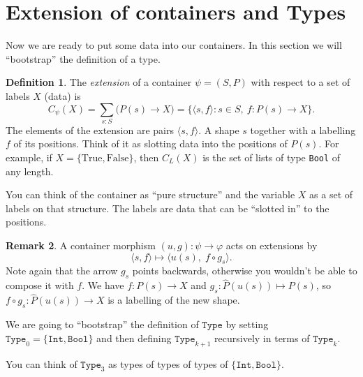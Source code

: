 \documentclass[11pt, a4paper]{article}
\theoremstyle{definition}
\newtheorem{definition}{Definition}[section]
\newtheorem{remark}[definition]{Remark}
\theoremstyle{plain}
\begin{document}
\newpage

\section{Extension of containers and Types}

Now we are ready to put some data into our containers.  In this
section we will ``bootstrap'' the definition of a type.

\noindent\colorbox{gray!15}{\parbox{\dimexpr\linewidth-2\fboxsep}{%
\begin{definition}\label{def:extension}
The \emph{extension} of a container $\psi = (S, P)$ with respect to a set
of labels $X$ (data) is
\[
  C_\psi(X) = \sum_{s:S}\bigl(P(s) \to X\bigr)
            = \bigl\{\langle s, f \rangle : s \in S,\ f : P(s) \to X\bigr\}.
\]
The elements of the extension are pairs $\langle s, f \rangle$.  A shape $s$
together with a labelling $f$ of its positions.  Think of it
as slotting data into the positions of $P(s)$.
For example, if $X = \{\mathrm{True}, \mathrm{False}\}$, then $C_L(X)$ is the
set of lists of type \texttt{Bool} of any length.
\end{definition}%
}}


You can think of the container as ``pure structure'' and the variable $X$ as
a set of labels on that structure.  The labels are data that can be
``slotted in'' to the positions.


\noindent\colorbox{green!10}{\parbox{\dimexpr\linewidth-2\fboxsep}{%
\begin{remark}
A container morphism $(u, g) : \psi \to \varphi$ acts on extensions by
\[
  \langle s, f \rangle \longmapsto \langle u(s),\; f \circ g_s \rangle.
\]
Note again that the arrow $g_s$
points backwards, otherwise you wouldn't be able to compose it with $f$.  We
have $f : P(s) \to X$ and $g_s : \hat{P}(u(s)) \mapsto P(s)$, so
$f \circ g_s : \hat{P}(u(s)) \to X$ is a labelling of the new shape.
\end{remark}%
}}

We are going to ``bootstrap'' the definition of $\texttt{Type}$ by
setting $\texttt{Type}_0 = \{\texttt{Int}, \texttt{Bool}\}$ and then
defining $\texttt{Type}_{k+1}$ recursively in terms of
$\texttt{Type}_k$.

You can think of $\texttt{Type}_3$ as types of
types of types of $\{\texttt{Int}, \texttt{Bool}\}$.

\medskip
\end{document}
